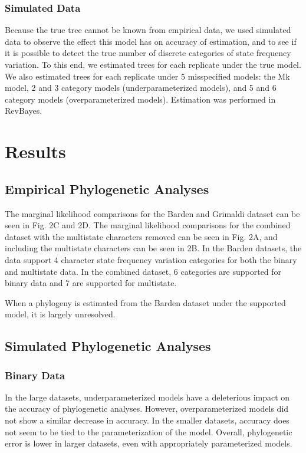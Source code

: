 \documentclass[]{article}
\begin{document}
\subsubsection{Simulated Data}

Because the true tree cannot be known from empirical data, we used simulated data to observe the effect this model has on accuracy of estimation, and to see if it is possible to detect the true number of discrete categories of state frequency variation.
To this end, we estimated trees for each replicate under the true model.
We also estimated trees for each replicate under 5 misspecified models: the Mk model, 2 and 3 category models (underparameterized models), and 5 and 6 category models (overparameterized models). 
Estimation was performed in RevBayes.\par


\section{Results}

\subsection{Empirical Phylogenetic Analyses}

The marginal likelihood comparisons for the Barden and Grimaldi dataset can be seen in Fig. 2C and 2D.
The marginal likelihood comparisons for the combined dataset with the multistate characters removed can be seen in Fig. 2A, and including the multistate characters can be seen in 2B.
In the Barden datasets, the data support 4 character state frequency variation categories for both the binary and multistate data.
In the combined dataset, 6 categories are supported for binary data and 7 are supported for multistate. \par
When a phylogeny is estimated from the Barden dataset under the supported model, it is largely unresolved. 


\subsection{Simulated Phylogenetic Analyses}
\subsubsection{Binary Data}

In the large datasets, underparameterized models have a deleterious impact on the accuracy of phylogenetic analyses. 
However, overparameterized models did not show a similar decrease in accuracy.
In the smaller datasets, accuracy does not seem to be tied to the parameterization of the model. 
Overall, phylogenetic error is lower in larger datasets, even with appropriately parameterized models. \par
\end{document}
